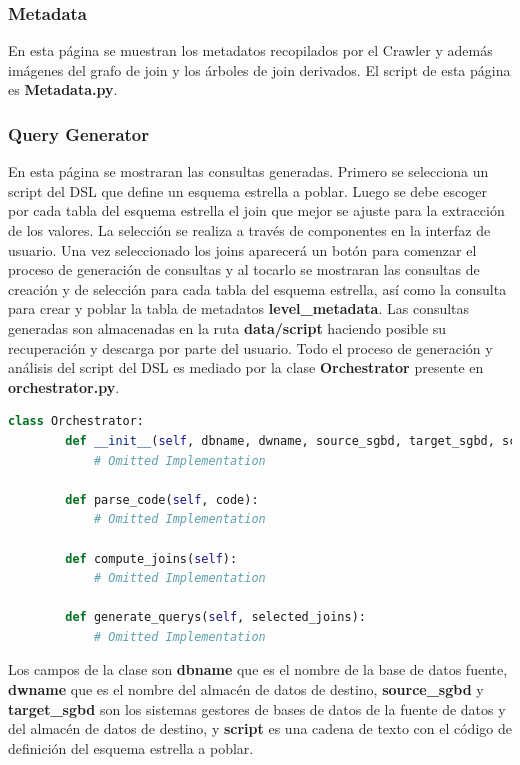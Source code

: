 \subsubsection{Metadata}

En esta p\'agina se muestran los metadatos recopilados por el Crawler y adem\'as im\'agenes del 
grafo de join y los \'arboles de join derivados. El script de esta p\'agina es \textbf{Metadata.py}.

\subsubsection{Query Generator}

En esta p\'agina se mostraran las consultas generadas. Primero se selecciona un script del DSL que 
define un esquema estrella a poblar. Luego se debe escoger por cada tabla del esquema estrella el 
join que mejor se ajuste para la extracci\'on de los valores. La selecci\'on se realiza a trav\'es 
de componentes en la interfaz de usuario. Una vez seleccionado los joins aparecer\'a un bot\'on 
para comenzar el proceso de generaci\'on de consultas y al tocarlo se mostraran las consultas 
de creaci\'on y de selecci\'on para cada tabla del esquema estrella, as\'i como la consulta 
para crear y poblar la tabla de metadatos \textbf{level\_metadata}. Las consultas generadas 
son almacenadas en la ruta \textbf{data/script} haciendo posible su recuperaci\'on y descarga por parte del usuario. 
Todo el proceso de generaci\'on y an\'alisis del script del DSL es mediado por la clase \textbf{Orchestrator} 
presente en \textbf{orchestrator.py}. 

\begin{lstlisting}[label={code:orchestrator}, caption={Clase Orchestrator}, language={python}]
    class Orchestrator:
        def __init__(self, dbname, dwname, source_sgbd, target_sgbd, script) -> None:
            # Omitted Implementation

        def parse_code(self, code):
            # Omitted Implementation

        def compute_joins(self):
            # Omitted Implementation

        def generate_querys(self, selected_joins):
            # Omitted Implementation
\end{lstlisting}

Los campos de la clase son \textbf{dbname} que es el nombre de la base de datos fuente, 
\textbf{dwname} que es el nombre del almac\'en de datos de destino, \textbf{source\_sgbd} y 
\textbf{target\_sgbd} son los sistemas gestores de bases de datos de la fuente de datos y 
del almac\'en de datos de destino, y \textbf{script} es una cadena de texto con el c\'odigo 
de definici\'on del esquema estrella a poblar.

